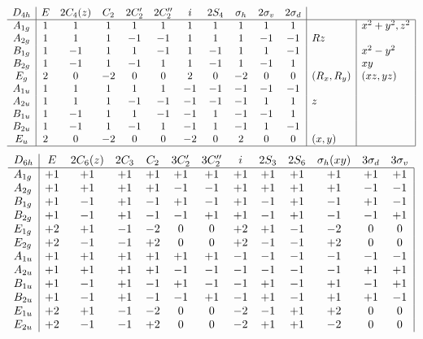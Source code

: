\[
\begin{array}{c|cccccccccc|l|l|l}
D_{4h} & E & 2C_4 (z)& C_2& 2C'_2 &2C''_2 &i& 2S_4& \sigma_h &2\sigma_v&2\sigma_d & \multicolumn{1}{c} {\;} & \multicolumn{1}{c}{}  \\
\hline
A_{1g}&	1	&1	&1&	1&	1&	1&	1&	1	&1	&1& &x^2+y^2, z^2 \\
A_{2g}	&1&	1&	1&	-1&	-1&	1	&1	&1	&-1&	-1&	Rz&\\	
B_{1g}	&1	&-1&	1	&1	&-1&	1	&-1&	1&	1&	-1	& &	x^2-y^2\\
B_{2g}	&1	&-1&	1&	-1&	1&	1&	-1&	1&	-1&	1&		&xy\\
E_g&	2	&0	&-2&	0&	0&	2	&0	&-2&	0&	0&	(R_x, R_y)&(xz, yz)\\
A_{1u}&	1&	1&	1&	1&	1&	-1&	-1&	-1&	-1&	-1	&&	\\
A_{2u}&	1&	1&	1&	-1&	-1&	-1&	-1&	-1&	1&	1	&z&	\\
B_{1u}&	1&	-1&	1&	1&	-1&	-1&	1&	-1&	-1&	1	& &	\\
B_{2u}&	1&	-1&	1&	-1&	1&	-1&	1&	-1&	1&	-1	&  &	\\
E_u&	2&	0&	-2&	0&	0&	-2&	0&	2&	0&	0&	(x, y)&	\\
\hline
\end{array}
\]
\[
\begin{array}{l|cccccccccccc|l|l}
 D_{6h}  & E & \multicolumn{1}{c}{2C_6(z)} & 2C_3 & C_2 & 3C'_2  & 3C''_2
 &i  & 2S_3  & 2S_6  & \multicolumn{1}{c}{\sigma_{h} (xy)} &
3\sigma_{d}  & \multicolumn{1}{c}{3\sigma_{v}}   \\
\hline
 A_{1g} & +1  & +1  & +1  & +1  & +1  & +1  & +1  & +1  & +1  & +1  & +1  & +1   \\
 A_{2g} & +1  & +1  & +1  & +1  & -1  & -1  & +1  & +1  & +1  & +1  & -1  & -1   \\
 B_{1g} & +1  & -1  & +1  & -1  & +1  & -1  & +1  & -1  & +1  & -1  & +1  & -1    \\
 B_{2g} & +1  & -1  & +1  & -1  & -1  & +1  & +1  & -1  & +1  & -1  & -1  & +1    \\
 E_{1g} & +2 & +1  & -1  & -2 & 0 & 0 & +2 & +1  & -1  & -2 & 0 & 0   \\
 E_{2g} & +2 & -1  & -1  & +2 & 0 & 0 & +2 & -1  & -1  & +2 & 0 & 0   \\
 A_{1u} & +1  & +1  & +1  & +1  & +1  & +1  & -1  & -1  & -1  & -1  & -1  & -1    \\
 A_{2u} & +1  & +1  & +1  & +1  & -1  & -1  & -1  & -1  & -1  & -1  & +1  & +1  \\
 B_{1u} & +1  & -1  & +1  & -1  & +1  & -1  & -1  & +1  & -1  & +1  & -1  & +1  \\
 B_{2u} & +1  & -1  & +1  & -1  & -1  & +1  & -1  & +1  & -1  & +1  & +1  & -1   \\
 E_{1u} & +2 & +1  & -1  & -2 & 0 & 0 & -2 & -1  & +1  & +2 & 0 & 0  \\
 E_{2u}  & +2 & -1  & -1  & +2 & 0 & 0 & -2 & +1  & +1  & -2 & 0 & 0   \\
\end{array}
\]


